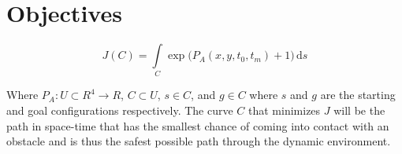 
\chapter{Objectives}

\label{chapter:objectives}

\begin{equation}
    J(C) = \int\limits_C \exp{\Big(P_A(x, y, t_0, t_m) + 1\Big)} \, \mathrm{d}s
    \label{eq:obj}
\end{equation}

Where $P_A : U \subset R^4 \rightarrow R$, $C \subset U$, $s \in C$, and $g
\in C$ where $s$ and $g$ are the starting and goal configurations respectively.
The curve $C$ that minimizes $J$ will be the path in space-time that has the
smallest chance of coming into contact with an obstacle and is thus the safest
possible path through the dynamic environment.

